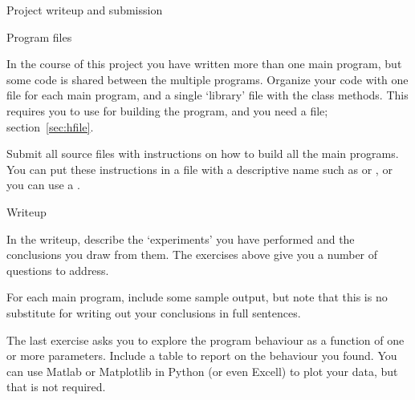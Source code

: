  {Project writeup and submission}

 {Program files}

In the course of this project you have written more than one main
program, but some code is shared between the multiple programs.
Organize your code with one file for each main program, and a single
`library' file with the class methods. This requires you to use
 for building the program, and you
need a  file; section~\ref{sec:hfile}.

Submit all source files with instructions on how to build all the main
programs. You can put these instructions in a file with a descriptive
name such as  or , or you can use a
.

 {Writeup}

In the writeup, describe the `experiments' you have performed and the
conclusions you draw from them. The exercises above give you a number
of questions to address.

For each main program, include some sample output, but note that this
is no substitute for writing out your conclusions in full sentences.

The last exercise asks you to explore the program behaviour as a
function of one or more parameters. Include a table to report on the
behaviour you found. You can use Matlab or Matplotlib in Python (or
even Excell) to plot your data, but that is not required.

\endinput

\begin{exercise}
  You can make the model more realistic by letting vaccination be
  only partly effective. For instance, 50\% of people got the flu
  vaccine, but it was only 40\% effective; 90\%~of people have the
  measles vaccine, and it is about 97\%
  effective. (\url{https://www.cdc.gov/nchs/fastats/immunize.htm}) How
  does your model function in this case? Keep in mind that different
  diseases have different degrees of infectuousness
  (\url{https://en.wikipedia.org/wiki/Basic_reproduction_number}).
\end{exercise}
